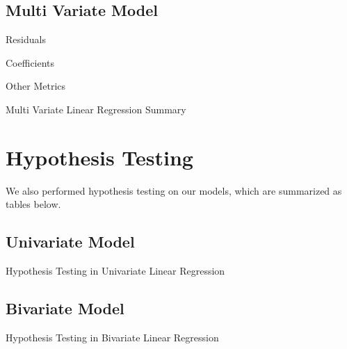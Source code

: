 \documentclass[11pt,a4paper]{article}
\begin{document}
\subsection{Multi Variate Model}
\begin{table}[H]
    \centering
    \begin{subtable}{.7\linewidth}
        \centering
        \caption{Residuals}
    \end{subtable}%

    \vspace{1em} %

    \begin{subtable}{.7\linewidth}
        \centering
        \caption{Coefficients}
    \end{subtable}%

    \vspace{1em}

    

    \vspace{1em} %

    \begin{subtable}{.7\linewidth}
        \centering
        \caption{Other Metrics}
    \end{subtable}

    \caption{Multi Variate Linear Regression Summary}
    \label{table: p13}
\end{table}

\newpage
\section{Hypothesis Testing}

We also performed hypothesis testing on our models, which are summarized as
tables below.

\subsection{Univariate Model}
\begin{table}[H]
    \centering
    \caption{Hypothesis Testing in Univariate Linear Regression}
\end{table}

\subsection{Bivariate Model}
\begin{table}[H]
    \centering
    \caption{Hypothesis Testing in Bivariate Linear Regression}
\end{table}
\end{document}
